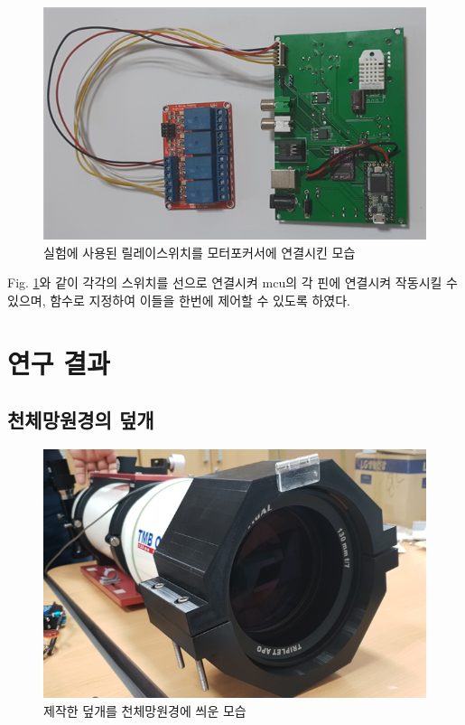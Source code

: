 \documentclass[twoside,11pt]{gshs_thesis}
\begin{document}
 \begin{figure}[h]
	\begin{center}
		\includegraphics[width = 12cm]{relay}
	\end{center}
	\caption{실험에 사용된 릴레이스위치를 모터포커서에 연결시킨 모습}
	\label{relay}
\end{figure}

 Fig. \ref{relay}와 같이 각각의 스위치를 선으로 연결시켜 mcu의 각 핀에 연결시켜 작동시킬 수 있으며, 함수로 지정하여 이들을 한번에 제어할 수 있도록 하였다.
 
\newpage
\section{연구 결과}

\subsection{천체망원경의 덮개}

 \begin{figure}[h]
	\begin{center}
		\includegraphics[width = 12cm]{cover}
	\end{center}
	\caption{제작한 덮개를 천체망원경에 씌운 모습}
	\label{cover}
\end{figure}
\end{document}
